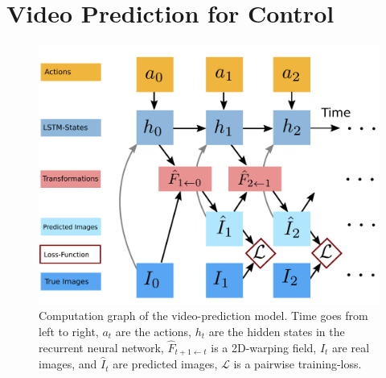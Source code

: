 \section{Video Prediction for Control}
\label{sec:model}

\begin{figure}[t]
	\centering
	\includegraphics[width=0.9\columnwidth]{images_general/prediction_model.pdf}
	\caption{\small{Computation graph of the video-prediction model. Time goes from left to right, $a_t$ are the actions, $h_t$ are the hidden states in the recurrent neural network, $\hat{F}_{t+1 \leftarrow t}$ is a 2D-warping field, $I_t$ are real images, and $\hat{I}_t$ are predicted images, $\mathcal{L}$ is a pairwise training-loss.}}   
	\label{fig:prediction_model}
\end{figure}

